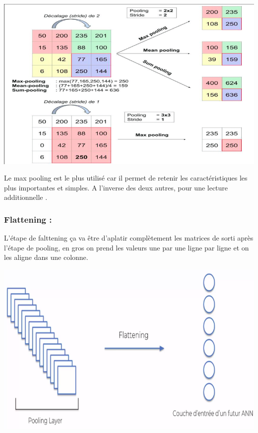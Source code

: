 \begin{center}
	\includegraphics[scale=0.3]{img15.png}
\end{center}

Le max pooling est le plus utilisé car il permet de retenir les caractéristiques les plus importantes et simples. A l’inverse des deux autres, pour une lecture additionnelle \cite{scherer2010evaluation}.

\subsubsection{Flattening : }

L’étape de falttening ça va être d’aplatir complètement les matrices de sorti après l’étape de pooling, en gros on prend les valeurs une par une ligne par ligne et on les aligne dans une colonne.

\begin{center}
	\includegraphics[scale=0.3]{img16.png}
\end{center}


